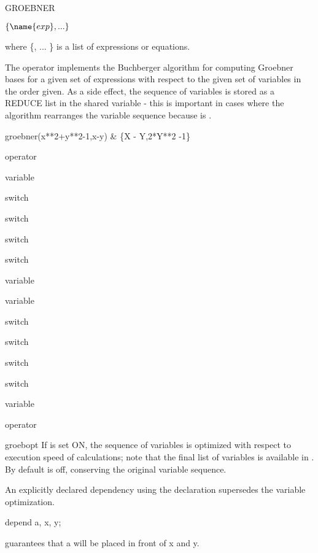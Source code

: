 \begin{Operator}{GROEBNER}
\begin{Syntax}

  \(\{\name{exp}, ...\}\)

\end{Syntax}
where \{, ... \} is a list of
expressions or equations.


The operator  implements the Buchberger algorithm
for computing Groebner bases for a given set of
expressions with respect to the given set of variables in the order
given.  As a side effect, the sequence of variables is stored as a REDUCE list
in the shared variable  - this is important in cases
where the algorithm rearranges the variable sequence because 
is .

\begin{Examples}
   groebner({x**2+y**2-1,x-y})  &  \{X - Y,2*Y**2 -1\}
\end{Examples}
\begin{Related}
\item[ \nameref{groebnerf} operator]
\item[ \nameref{gvarslast} variable]
\item[ \nameref{groebopt} switch]
\item[ \nameref{groebprereduce} switch]
\item[ \nameref{groebfullreduction} switch]
\item[ \nameref{gltbasis} switch]
\item[ \nameref{gltb} variable]
\item[ \nameref{glterms} variable]
\item[ \nameref{groebstat} switch]
\item[ \nameref{trgroeb} switch]
\item[ \nameref{trgroebs} switch]
\item[ \nameref{groebprot} switch]
\item[ \nameref{groebprotfile} variable]
\item[ \nameref{groebnert} operator]
\end{Related}
\end{Operator}


\begin{Switch}{groebopt}
If  is set ON, the sequence of variables is optimized
with respect to execution speed of  calculations; 
note that the final list of variables is available in .
By default  is off, conserving the original variable
sequence.

An explicitly declared dependency using the 
declaration  supersedes the variable optimization.
\begin{Examples}

   depend a, x, y;

\end{Examples}
guarantees that a will be placed in front of x and y.
\end{Switch}


